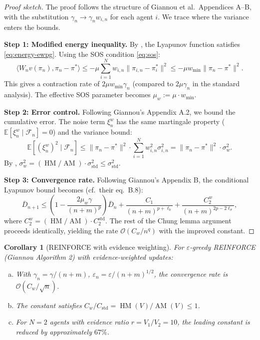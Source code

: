 \documentclass[11pt,a4paper]{article}
\newtheorem{corollary}[theorem]{Corollary}
\DeclareMathOperator{\AM}{AM}
\DeclareMathOperator{\HM}{HM}
\newcommand{\E}{\mathbb{E}}
\newcommand{\cF}{\mathcal{F}}
\newcommand{\ip}[2]{\langle #1, #2 \rangle}
\begin{document}
\begin{proof}[Proof sketch]
The proof follows the structure of Giannou et al.\ Appendices A--B, with the substitution $\gamma_n \to \gamma_n w_{i,n}$ for each agent $i$. We trace where the variance enters the bounds.

\textbf{Step 1: Modified energy inequality.} By , the Lyapunov function satisfies \eqref{eq:energy-ewpg}. Using the SOS condition \eqref{eq:sos}:
\begin{equation}
\label{eq:sos-contraction}
    \ip{W_n v(\pi_n)}{\pi_n - \pi^*} \leq -\mu \sum_{i=1}^N w_{i,n} \|\pi_{i,n} - \pi_i^*\|^2 \leq -\mu w_{\min} \|\pi_n - \pi^*\|^2.
\end{equation}
This gives a contraction rate of $2\mu w_{\min} \gamma_n$ (compared to $2\mu\gamma_n$ in the standard analysis). The effective SOS parameter becomes $\mu_w := \mu \cdot w_{\min}$.

\textbf{Step 2: Error control.} Following Giannou's Appendix A.2, we bound the cumulative error. The noise term $\xi_n^w$ has the same martingale property ($\E[\xi_n^w \mid \cF_n] = 0$) and the variance bound:
\[
    \E[(\xi_n^w)^2 \mid \cF_n] \leq \|\pi_n - \pi^*\|^2 \cdot \sum_{i=1}^N w_{i,n}^2 \sigma_{i,n}^2 = \|\pi_n - \pi^*\|^2 \cdot \sigma_w^2.
\]
By , $\sigma_w^2 = (\HM/\AM) \cdot \sigma_{\text{std}}^2 \leq \sigma_{\text{std}}^2$.

\textbf{Step 3: Convergence rate.} Following Giannou's Appendix B, the conditional Lyapunov bound becomes (cf.\ their eq.\ B.8):
\begin{equation}
    \bar{D}_{n+1} \leq \left(1 - \frac{2\mu_w \gamma}{(n+m)^p}\right) \bar{D}_n + \frac{C_1}{(n+m)^{p+\ell_b}} + \frac{C_2^w}{(n+m)^{2p-2\ell_\sigma}},
\end{equation}
where $C_2^w = (\HM/\AM) \cdot C_2^{\text{std}}$. The rest of the Chung lemma argument proceeds identically, yielding the rate $\mathcal{O}(C_w / n^q)$ with the improved constant.
\end{proof}

\begin{corollary}[REINFORCE with evidence weighting]
\label{cor:reinforce}
For $\varepsilon$-greedy REINFORCE (Giannou Algorithm 2) with evidence-weighted updates:
\begin{enumerate}[(a)]
    \item With $\gamma_n = \gamma/(n+m)$, $\varepsilon_n = \varepsilon/(n+m)^{1/2}$, the convergence rate is $\mathcal{O}(C_w / \sqrt{n})$.
    \item The constant satisfies $C_w / C_{\mathrm{std}} = \HM(V)/\AM(V) \leq 1$.
    \item For $N = 2$ agents with evidence ratio $r = V_1/V_2 = 10$, the leading constant is reduced by approximately $67\%$.
\end{enumerate}
\end{corollary}
\end{document}
